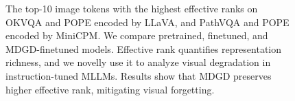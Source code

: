 \begin{figure}[btp]
    \centering
    \hfill
    
    
    \hfill

    
    \caption{The top-10 image tokens with the highest effective ranks on OKVQA and POPE encoded by LLaVA, and PathVQA and POPE encoded by MiniCPM. 
    We compare pretrained, finetuned, and MDGD-finetuned models. 
    Effective rank \cite{wei2024diff} quantifies representation richness, and we novelly use it to analyze visual degradation in instruction-tuned MLLMs. Results show that MDGD preserves higher effective rank, mitigating visual forgetting.}
    \label{fig:intro}
    \vspace{-1em}
\end{figure}
